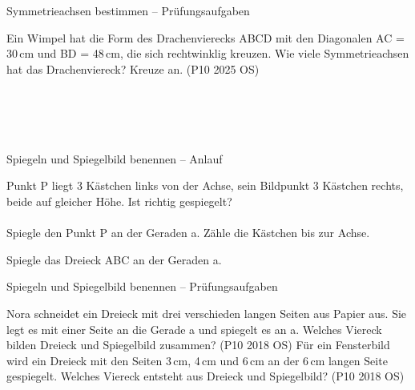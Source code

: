 \begin{aufgabe}{Symmetrieachsen bestimmen – Prüfungsaufgaben}
\begin{teile}
\teil Ein Wimpel hat die Form des Drachenvierecks ABCD mit den Diagonalen AC = 30\,cm und BD = 48\,cm, die sich rechtwinklig kreuzen. Wie viele Symmetrieachsen hat das Drachenviereck? Kreuze an. \hfill (P10 2025 OS) \\  \\  \\  \\  \\ 

\end{teile}
\end{aufgabe}

\begin{aufgabe}{Spiegeln und Spiegelbild benennen – Anlauf}
\begin{teile}
\teil Punkt P liegt 3 Kästchen links von der Achse, sein Bildpunkt 3 Kästchen rechts, beide auf gleicher Höhe. Ist richtig gespiegelt? \\  \\ 
\teil Spiegle den Punkt P an der Geraden a. Zähle die Kästchen bis zur Achse.

\begin{ksys}[xmin=0,xmax=9,ymin=0,ymax=8]   \end{ksys}
\teil Spiegle das Dreieck ABC an der Geraden a.

\begin{ksys}[xmin=0,xmax=10,ymin=0,ymax=7]     \end{ksys}
\end{teile}
\end{aufgabe}

\begin{aufgabe}{Spiegeln und Spiegelbild benennen – Prüfungsaufgaben}
\begin{teile}
\teil Nora schneidet ein Dreieck mit drei verschieden langen Seiten aus Papier aus. Sie legt es mit einer Seite an die Gerade a und spiegelt es an a. Welches Viereck bilden Dreieck und Spiegelbild zusammen? \hfill (P10 2018 OS)
\teil Für ein Fensterbild wird ein Dreieck mit den Seiten 3\,cm, 4\,cm und 6\,cm an der 6\,cm langen Seite gespiegelt. Welches Viereck entsteht aus Dreieck und Spiegelbild? \hfill (P10 2018 OS)
\end{teile}
\end{aufgabe}
